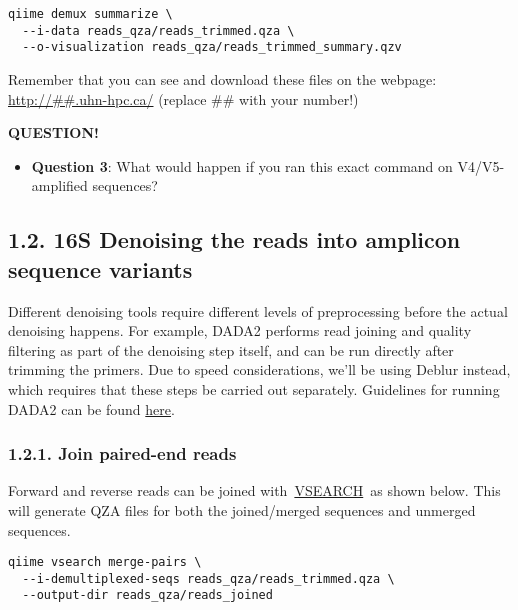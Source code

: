 \documentclass[
]{book}
\providecommand{\tightlist}{%
  \setlength{\itemsep}{0pt}\setlength{\parskip}{0pt}}
\newenvironment{bluebox}{
  \definecolor{shadecolor}{RGB}{172, 210, 237}
  \color{white}
  \begin{shaded}}
 {\end{shaded}}
\begin{document}
\begin{verbatim}
qiime demux summarize \
  --i-data reads_qza/reads_trimmed.qza \
  --o-visualization reads_qza/reads_trimmed_summary.qzv
\end{verbatim}

Remember that you can see and download these files on the webpage: \url{http://\#\#.uhn-hpc.ca/} (replace \#\# with your number!)

\begin{bluebox}

\begin{center}
\textbf{QUESTION!}

\end{center}

\begin{itemize}
\tightlist
\item
  \textbf{Question 3}: What would happen if you ran this exact command on V4/V5-amplified sequences?
\end{itemize}

\end{bluebox}

\subsection{1.2. 16S Denoising the reads into amplicon sequence variants}\label{s-denoising-the-reads-into-amplicon-sequence-variants}

Different denoising tools require different levels of preprocessing before the actual denoising happens. For example, DADA2 performs read joining and quality filtering as part of the denoising step itself, and can be run directly after trimming the primers. Due to speed considerations, we'll be using Deblur instead, which requires that these steps be carried out separately. Guidelines for running DADA2 can be found \href{https://github.com/LangilleLab/microbiome_helper/wiki/QIIME2-DADA2-Quick-Reference}{here}.

\subsubsection{1.2.1. Join paired-end reads}\label{join-paired-end-reads}

Forward and reverse reads can be joined with~\href{https://github.com/torognes/vsearch}{VSEARCH}~as shown below. This will generate QZA files for both the joined/merged sequences and unmerged sequences.

\begin{verbatim}
qiime vsearch merge-pairs \
  --i-demultiplexed-seqs reads_qza/reads_trimmed.qza \
  --output-dir reads_qza/reads_joined
\end{verbatim}
\end{document}
